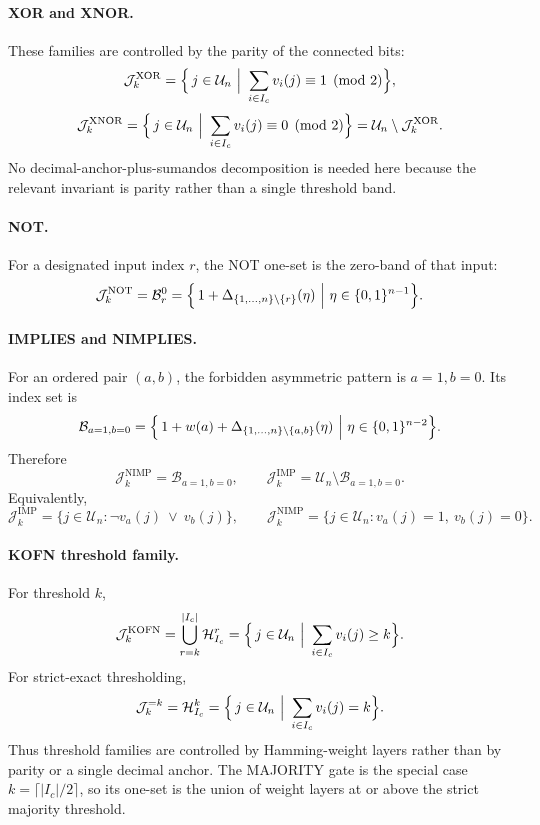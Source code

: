 \documentclass[11pt]{article}
\theoremstyle{definition}
\newcommand{\U}{\mathcal{U}_n}
\newcommand{\Ic}{I_c}
\newcommand{\J}{\mathcal{J}}
\newcommand{\Band}[2]{\mathcal{B}_{#1}^{#2}}
\newcommand{\Weight}[2]{\mathcal{H}_{#1}^{#2}}
\newcommand{\bits}{\{0,1\}}
\begin{document}
\paragraph{XOR and XNOR.}
These families are controlled by the parity of the connected bits:
\[
\J_k^{\mathrm{XOR}}
=
\Bigl\{\,j\in\U\ \Big|\
\sum_{i\in\Ic}v_i(j)\equiv 1\pmod 2
\Bigr\},
\]
\[
\J_k^{\mathrm{XNOR}}
=
\Bigl\{\,j\in\U\ \Big|\
\sum_{i\in\Ic}v_i(j)\equiv 0\pmod 2
\Bigr\}
=
\U\setminus\J_k^{\mathrm{XOR}}.
\]
No decimal-anchor-plus-sumandos decomposition is needed here because the relevant invariant is parity rather than a single threshold band.

\paragraph{NOT.}
For a designated input index \(r\), the NOT one-set is the zero-band of that input:
\[
\J_k^{\mathrm{NOT}}=\Band{r}{0}
=
\Bigl\{\,1+\Delta_{\{1,\dots,n\}\setminus\{r\}}(\eta)\ \Big|\
\eta\in\bits^{n-1}\Bigr\}.
\]

\paragraph{IMPLIES and NIMPLIES.}
For an ordered pair \((a,b)\), the forbidden asymmetric pattern is \(a=1,b=0\). Its index set is
\[
\mathcal{B}_{a=1,b=0}
=
\Bigl\{\,1+w(a)+\Delta_{\{1,\dots,n\}\setminus\{a,b\}}(\eta)\ \Big|\
\eta\in\bits^{n-2}\Bigr\}.
\]
Therefore
\[
\J_k^{\mathrm{NIMP}}=\mathcal{B}_{a=1,b=0},
\qquad
\J_k^{\mathrm{IMP}}=\U\setminus\mathcal{B}_{a=1,b=0}.
\]
Equivalently,
\[
\J_k^{\mathrm{IMP}}=\{j\in\U:\neg v_a(j)\ \lor\ v_b(j)\},
\qquad
\J_k^{\mathrm{NIMP}}=\{j\in\U:v_a(j)=1,\ v_b(j)=0\}.
\]

\paragraph{KOFN threshold family.}
For threshold \(k\),
\[
\J_k^{\mathrm{KOFN}}
=
\bigcup_{r=k}^{|\Ic|}\Weight{\Ic}{r}
=
\Bigl\{\,j\in\U\ \Big|\
\sum_{i\in\Ic} v_i(j)\ge k
\Bigr\}.
\]
For strict-exact thresholding,
\[
\J_k^{=k}=\Weight{\Ic}{k}
=
\Bigl\{\,j\in\U\ \Big|\
\sum_{i\in\Ic} v_i(j)=k
\Bigr\}.
\]
Thus threshold families are controlled by Hamming-weight layers rather than by parity or a single decimal anchor. The MAJORITY gate is the special case \(k=\lceil|\Ic|/2\rceil\), so its one-set is the union of weight layers at or above the strict majority threshold.
\end{document}

